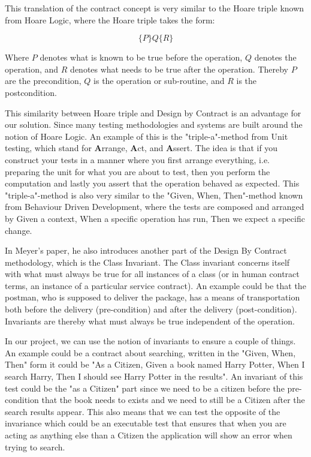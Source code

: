 This translation of the contract concept is very similar to the Hoare triple known from Hoare Logic, where the Hoare triple takes the form:

\begin{equation}
\{P\} Q \{R\}
\end{equation}

Where $P$ denotes what is known to be true before the operation, $Q$ denotes the operation, and $R$ denotes what needs to be true after the operation. Thereby $P$ are the precondition, $Q$ is the operation or sub-routine, and $R$ is the postcondition. 

This similarity between Hoare triple and Design by Contract is an advantage for our solution.
Since many testing methodologies and systems are built around the notion of Hoare Logic. 
An example of this is the "triple-a"-method from Unit testing, which stand for \textbf{A}rrange, \textbf{A}ct, and \textbf{A}ssert.
The idea is that if you construct your tests in a manner where you first arrange everything, i.e. preparing the unit for what you are about to test, then you perform the computation and lastly you assert that the operation behaved as expected. 
This "triple-a"-method is also very similar to the "Given, When, Then"-method known from Behaviour Driven Development, where the tests are composed and arranged by Given a context, When a specific operation has run, Then we expect a specific change. 

In Meyer's paper, he also introduces another part of the Design By Contract methodology, which is the Class Invariant. 
The Class invariant concerns itself with what must always be true for all instances of a class (or in human contract terms, an instance of a particular service contract).
An example could be that the postman, who is supposed to deliver the package, has a means of transportation both before the delivery (pre-condition) and after the delivery (post-condition).
Invariants are thereby what must always be true independent of the operation.

In our project, we can use the notion of invariants to ensure a couple of things. 
An example could be a contract about searching, written in the "Given, When, Then" form it could be "As a Citizen, Given a book named Harry Potter, When I search Harry, Then I should see Harry Potter in the results".
An invariant of this test could be the "as a Citizen" part since we need to be a citizen before the pre-condition that the book needs to exists and we need to still be a Citizen after the search results appear.
This also means that we can test the opposite of the invariance which could be an executable test that ensures that when you are acting as anything else than a Citizen the application will show an error when trying to search.

